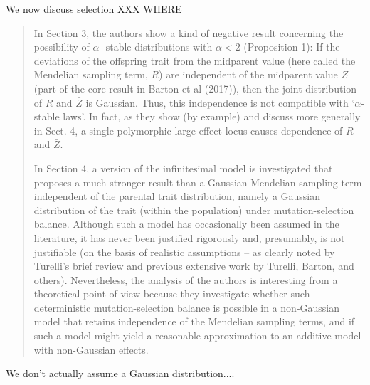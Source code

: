 We now discuss selection XXX WHERE

\begin{quote}
In Section 3, the authors show a kind of negative result concerning the possibility of $\alpha$-
stable distributions with $\alpha < 2$ (Proposition 1): If the deviations of the offspring trait
from the midparent value (here called the Mendelian sampling term, $R$) are independent
of the midparent value $\bar Z$ (part of the core result in Barton et al (2017)), then the joint
distribution of $R$ and $\bar Z$ is Gaussian. Thus, this independence is not compatible with ‘$\alpha$-
stable laws’. In fact, as they show (by example) and discuss more generally in Sect. 4, a
single polymorphic large-effect locus causes dependence of $R$ and $\bar Z$.

In Section 4, a version of the infinitesimal model is investigated that proposes a much
stronger result than a Gaussian Mendelian sampling term independent of the parental
trait distribution, namely a Gaussian distribution of the trait (within the population)
under mutation-selection balance. Although such a model has occasionally been assumed
in the literature, it has never been justified rigorously and, presumably, is not justifiable
(on the basis of realistic assumptions – as clearly noted by Turelli’s brief review and
previous extensive work by Turelli, Barton, and others). Nevertheless, the analysis of the
authors is interesting from a theoretical point of view because they investigate whether
such deterministic mutation-selection balance is possible in a non-Gaussian model that
retains independence of the Mendelian sampling terms, and if such a model might yield a
reasonable approximation to an additive model with non-Gaussian effects.
\end{quote}

We don't actually assume a Gaussian distribution....

